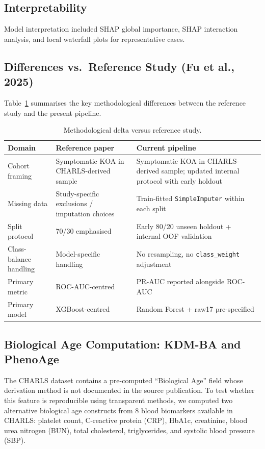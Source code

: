 \documentclass[11pt,a4paper]{article}
\begin{document}
\subsection{Interpretability}
Model interpretation included SHAP global importance\cite{Lundberg2017}, SHAP interaction analysis,
and local waterfall plots for representative cases.

\subsection{Differences vs.\ Reference Study (Fu et al., 2025)}
Table~\ref{tab:paper-delta} summarises the key methodological differences between the reference
study and the present pipeline.

\begin{table}[h!]
\centering
\caption{Methodological delta versus reference study.}
\label{tab:paper-delta}
\begin{tabular}{p{3.4cm}p{5.1cm}p{5.1cm}}
\toprule
Domain & Reference paper & Current pipeline \\
\midrule
Cohort framing & Symptomatic KOA in CHARLS-derived sample &
  Symptomatic KOA in CHARLS-derived sample; updated internal protocol with early holdout \\
Missing data & Study-specific exclusions / imputation choices &
  Train-fitted \texttt{SimpleImputer} within each split \\
Split protocol & 70/30 emphasised & Early 80/20 unseen holdout + internal OOF validation \\
Class-balance handling & Model-specific handling &
  No resampling, no \texttt{class\_weight} adjustment \\
Primary metric & ROC-AUC-centred & PR-AUC reported alongside ROC-AUC \\
Primary model & XGBoost-centred & Random Forest + raw17 pre-specified \\
\bottomrule
\end{tabular}
\end{table}

\subsection{Biological Age Computation: KDM-BA and PhenoAge}
\label{sec:kdm-ba}

The CHARLS dataset contains a pre-computed ``Biological Age'' field whose derivation method is not
documented in the source publication\cite{Fu2025}. To test whether this feature is reproducible using
transparent methods, we computed two alternative biological age constructs from 8 blood biomarkers
available in CHARLS: platelet count, C-reactive protein (CRP), HbA1c, creatinine, blood urea nitrogen
(BUN), total cholesterol, triglycerides, and systolic blood pressure (SBP).
\end{document}

